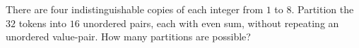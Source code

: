 There are four indistinguishable copies of each integer from $1$ to $8$. Partition the $32$ tokens into $16$ unordered pairs, each with even sum, without repeating an unordered value-pair. How many partitions are possible?
